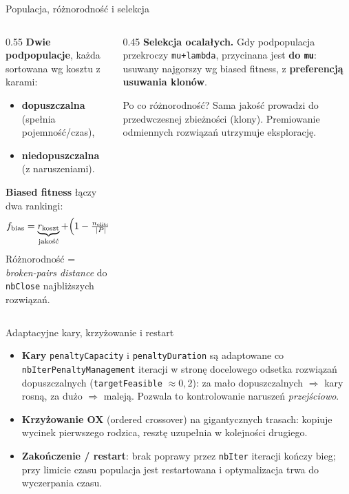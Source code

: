 \documentclass[aspectratio=169,11pt]{beamer}
\begin{document}
\begin{frame}{Populacja, różnorodność i selekcja}
  \begin{columns}[T]
    \begin{column}{0.55\textwidth}
      \textbf{Dwie podpopulacje}, każda sortowana wg kosztu z karami:
      \begin{itemize}
        \item \textbf{dopuszczalna} (spełnia pojemność/czas),
        \item \textbf{niedopuszczalna} (z naruszeniami).
      \end{itemize}
      \vspace{0.4em}
      \textbf{Biased fitness} łączy dwa rankingi:
      \[
        f_{\text{bias}} = \underbrace{r_{\text{koszt}}}_{\text{jakość}}
          + \Bigl(1-\tfrac{n_{\text{elite}}}{|P|}\Bigr)\underbrace{r_{\text{div}}}_{\text{różnorodność}}
      \]
      Różnorodność = \emph{broken-pairs distance} do \texttt{nbClose} najbliższych rozwiązań.
    \end{column}
    \begin{column}{0.45\textwidth}
      \textbf{Selekcja ocalałych.} Gdy podpopulacja przekroczy \texttt{mu+lambda}, przycinana jest \textbf{do \texttt{mu}}: usuwany najgorszy wg biased fitness, z \textbf{preferencją usuwania klonów}.
      \vspace{0.5em}
      \begin{block}{Po co różnorodność?}
        \footnotesize Sama jakość prowadzi do przedwczesnej zbieżności (klony). Premiowanie odmiennych rozwiązań utrzymuje eksplorację.
      \end{block}
    \end{column}
  \end{columns}
\end{frame}

\begin{frame}{Adaptacyjne kary, krzyżowanie i restart}
  \begin{itemize}
    \item \textbf{Kary} \texttt{penaltyCapacity} i \texttt{penaltyDuration} są adaptowane co \texttt{nbIterPenaltyManagement} iteracji w stronę docelowego odsetka rozwiązań dopuszczalnych (\texttt{targetFeasible} $\approx 0{,}2$): za mało dopuszczalnych $\Rightarrow$ kary rosną, za dużo $\Rightarrow$ maleją. Pozwala to kontrolowanie naruszeń \emph{przejściowo}.
    \item \textbf{Krzyżowanie OX} (ordered crossover) na gigantycznych trasach: kopiuje wycinek pierwszego rodzica, resztę uzupełnia w kolejności drugiego.
    \item \textbf{Zakończenie / restart}: brak poprawy przez \texttt{nbIter} iteracji kończy bieg; przy limicie czasu populacja jest restartowana i optymalizacja trwa do wyczerpania czasu.
  \end{itemize}
\end{frame}
\end{document}
